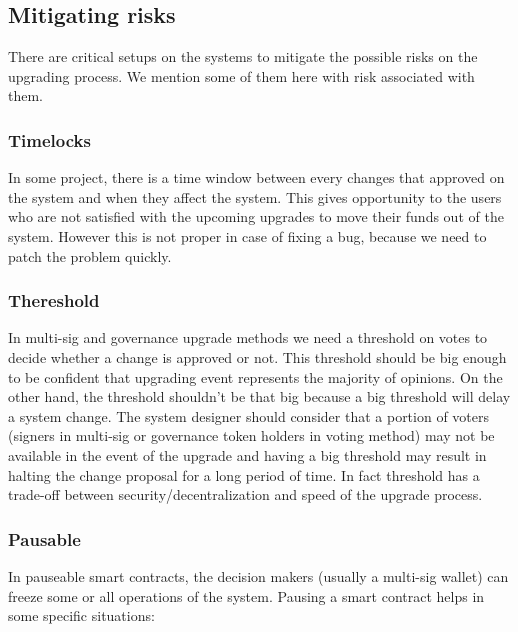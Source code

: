 

\subsection{Mitigating risks}
There are critical setups on the systems to mitigate the possible risks on the upgrading process. We mention some of them here with risk associated with them.

\subsubsection{Timelocks}
In some project, there is a time window between every changes that approved on the system and when they affect the system. This gives opportunity to the users who are not satisfied with the upcoming upgrades to move their funds out of the system. However this is not proper in case of fixing a bug, because we need to patch the problem quickly.

\subsubsection{Thereshold}
In multi-sig and governance upgrade methods we need a threshold on votes to decide whether a change is approved or not. This threshold should be big enough to be confident that upgrading event represents the majority of opinions. On the other hand, the threshold shouldn't be that big because a big threshold will delay a system change. The system designer should consider that a portion of voters (signers in multi-sig or governance token holders in voting method) may not be available in the event of the upgrade and having a big threshold may result in halting the change proposal for a long period of time. In fact threshold has a trade-off between security/decentralization and speed of the upgrade process.

\subsubsection{Pausable}
In pauseable smart contracts, the decision makers (usually a multi-sig wallet) can freeze some or all operations of the system. Pausing a smart contract helps in some specific situations:

